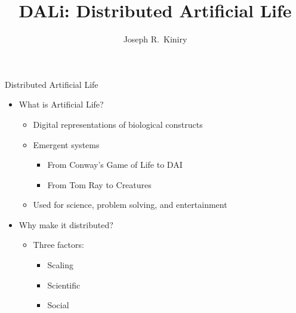 \documentclass[%
final,
slideColor,
nototal,
nocolorBG,
pdf,
accumulate,
next,
]{prosper}
\title{DALi: Distributed Artificial Life}
\author{Joseph R.~Kiniry}
\begin{document}
\maketitle








\begin{slide}{Distributed Artificial Life}
  \begin{itemize}
  \item What is Artificial Life?
    \begin{itemize}
    \item Digital representations of biological constructs
    \item Emergent systems
      \begin{itemize}
      \item From Conway's Game of Life to DAI
      \item From Tom Ray to Creatures
      \end{itemize}
    \item Used for science, problem solving, and entertainment
    \end{itemize}
  \item Why make it distributed?
    \begin{itemize}
    \item Three factors:
      \begin{itemize}
        \item Scaling
        \item Scientific
        \item Social
      \end{itemize}
    \end{itemize}
  \end{itemize}
\end{slide}
\end{document}
